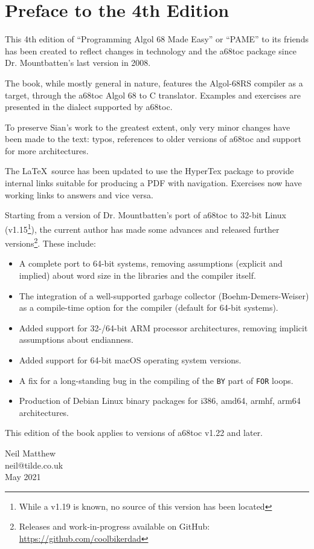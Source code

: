 %
\parindent=5mm
\chapter{Preface to the 4th Edition}
This 4th edition of ``Programming Algol 68 Made Easy'' or ``PAME''
to its friends has been created to reflect changes in technology and
the a68toc package since Dr. Mountbatten's last version in 2008.

The book, while mostly general in nature, features the Algol-68RS compiler
as a target, through the a68toc Algol 68 to C translator. Examples and
exercises are presented in the dialect supported by a68toc.

To preserve Sian's work to the greatest extent, only very minor
changes have been made to the text: typos, references to older versions
of a68toc and support for more architectures.

The \LaTeX\ source has been updated to use the HyperTex package to
provide internal links suitable for producing a PDF with navigation.
Exercises now have working links to answers and vice versa.

Starting from a version of Dr. Mountbatten's port of a68toc to 32-bit Linux
(v1.15\footnote{While a v1.19 is known, no source of this version has been located}),
the current author has made some advances and released further
versions\footnote{Releases and work-in-progress available on GitHub: \newline\url{https://github.com/coolbikerdad}}.
These include:
\begin{itemize}
\item A complete port to 64-bit systems, removing assumptions (explicit and implied)
about word size in the libraries and the compiler itself.
\item The integration of a well-supported garbage collector (Boehm-Demers-Weiser) as
a compile-time option for the compiler (default for 64-bit systems).
\item Added support for 32-/64-bit ARM processor architectures, removing implicit assumptions about endianness.
\item Added support for 64-bit macOS operating system versions.
\item A fix for a long-standing bug in the compiling of the \verb|BY| part of \verb|FOR| loops.
\item Production of Debian Linux binary packages for i386, amd64, armhf, arm64 architectures.
\end{itemize}

This edition of the book applies to versions of a68toc v1.22 and later.

\bigskip\bigskip
\begin{flushright}
Neil Matthew\\
neil@tilde.co.uk\\
May 2021
\end{flushright}
